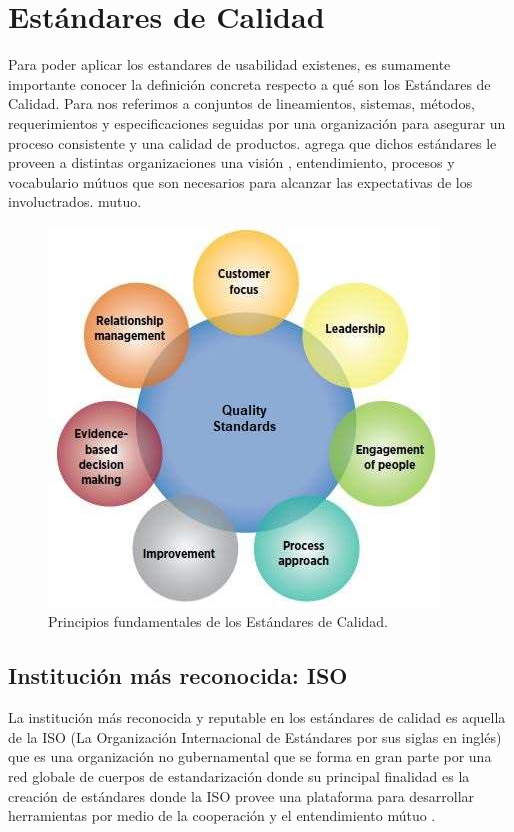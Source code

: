 \section{Estándares de Calidad}
Para poder aplicar los estandares de usabilidad existenes, es sumamente importante conocer la
definición concreta respecto a qué son los Estándares de Calidad. Para \cite{safetyculture-2022,unknown-author-no-dateD,ni-business-info-no-date} %
nos referimos a conjuntos de lineamientos, sistemas, métodos, requerimientos y especificaciones
seguidas por una organización para asegurar un proceso consistente y una calidad de productos.
\cite{unknown-author-no-dateD} agrega que dichos estándares le proveen a distintas organizaciones una visión , entendimiento,
procesos y vocabulario mútuos que son necesarios para alcanzar las expectativas de los involuctrados.
mutuo.
\begin{figure}[t]
    \centering
    \includegraphics[scale=0.5]{../images/fig1.JPG}
    \caption{Principios fundamentales de los Estándares de Calidad.}
    \label{fig:fig1}    
\end{figure}

\subsection{Institución más reconocida: ISO}
La institución más reconocida y reputable en los estándares de calidad es aquella de la ISO
(La Organización Internacional de Estándares por sus siglas en inglés) que es una organización
no gubernamental que se forma en gran parte por una red globale de cuerpos de estandarización
donde su principal finalidad es la creación de estándares donde la ISO provee una plataforma
para desarrollar herramientas por medio de la cooperación y el entendimiento mútuo \cite{international-organization-for-standardization-2019}. %


